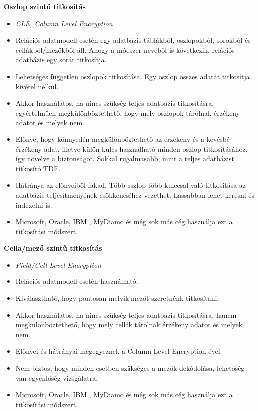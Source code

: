 \noindent\textbf{Oszlop szintű titkosítás}\newline
\begin{itemize}
	\item \textit{CLE, Column Level Encryption}
	\item Relációs adatmodell esetén egy adatbázis táblákból, oszlopokból, sorokból és cellákból/mezőkből áll. Ahogy a módszer nevéből is következik, relációs adatbázis egy sorát titkosítja.
	\item Lehetséges független oszlopok titkosítása. Egy oszlop összes adatát titkosítja kivétel nélkül. 
	\item Akkor használatos, ha nincs szükség teljes adatbázis titkosításra, egyértelműen megkülönböztethető, hogy mely oszlopok tárolnak érzékeny adatot és melyek nem.
	\item Előnye, hogy könnyedén megkülönböztethető az érzékeny és a kevésbé érzékeny adat, illetve külön kulcs használható minden oszlop titkosításához, így növelve a biztonságot. Sokkal rugalmasabb, mint a teljes adatbázist titkosító TDE.
	\item Hátránya az előnyeiből fakad. Több oszlop több kulccsal való titkosítása az adatbázis teljesítményének csökkenéséhez vezethet. Lassabban lehet keresni és indexelni is.
	\item Microsoft, Oracle, IBM , MyDiamo és még sok más cég használja ezt a titkosítási módszert.
\end{itemize}

\bigskip

\noindent\textbf{Cella/mező szintű titkosítás}
\begin{itemize}
	\item \textit{Field/Cell Level Encryption}
	\item Relációs adatmodell esetén használható.
	\item Kiválasztható, hogy pontosan melyik mezőt szeretnénk titkosítani. 
	\item Akkor használatos, ha nincs szükség teljes adatbázis titkosításra, hanem megkülönböztethető, hogy mely cellák tárolnak érzékeny adatot és melyek nem.
	\item Előnyei és hátrányai megegyeznek a Column Level Encryption-ével. 
	\item Nem biztos, hogy minden esetben szükséges a mezők dekódolása, lehetőség van egyenlőség vizsgálatra.
	\item Microsoft, Oracle, IBM , MyDiamo és még sok más cég használja ezt a titkosítási módszert.
\end{itemize}

